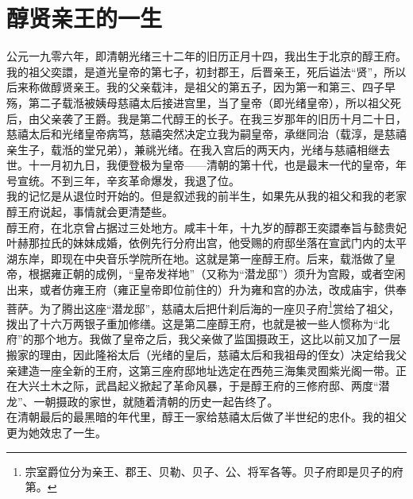 \fancyhead[RO]{} %
\fancyhead[LE]{} %
\chapter*{醇贤亲王的一生}
\thispagestyle{empty}
  公元一九零六年，即清朝光绪三十二年的旧历正月十四，我出生于北京的醇王府。我的祖父奕譞，是道光皇帝的第七子，初封郡王，后晋亲王，死后谥法“贤”，所以后来称做醇贤亲王。我的父亲载沣，是祖父的第五子，因为第一和第三、四子早殇，第二子载湉被姨母慈禧太后接进宫里，当了皇帝（即光绪皇帝），所以祖父死后，由父亲袭了王爵。我是第二代醇王的长子。在我三岁那年的旧历十月二十日，慈禧太后和光绪皇帝病笃，慈禧突然决定立我为嗣皇帝，承继同治（载淳，是慈禧亲生子，载湉的堂兄弟），兼祧光绪。在我入宫后的两天内，光绪与慈禧相继去世。十一月初九日，我便登极为皇帝——清朝的第十代，也是最末一代的皇帝，年号宣统。不到三年，辛亥革命爆发，我退了位。\\

  我的记忆是从退位时开始的。但是叙述我的前半生，如果先从我的祖父和我的老家醇王府说起，事情就会更清楚些。\\

  醇王府，在北京曾占据过三处地方。咸丰十年，十九岁的醇郡王奕譞奉旨与懿贵妃叶赫那拉氏的妹妹成婚，依例先行分府出宫，他受赐的府邸坐落在宣武门内的太平湖东岸，即现在中央音乐学院所在地。这就是第一座醇王府。后来，载湉做了皇帝，根据雍正朝的成例，“皇帝发祥地”（又称为“潜龙邸”）须升为宫殿，或者空闲出来，或者仿雍王府（雍正皇帝即位前住的）升为雍和宫的办法，改成庙宇，供奉菩萨。为了腾出这座“潜龙邸”，慈禧太后把什刹后海的一座贝子府\footnote{宗室爵位分为亲王、郡王、贝勒、贝子、公、将军各等。贝子府即是贝子的府第。}赏给了祖父，拨出了十六万两银子重加修缮。这是第二座醇王府，也就是被一些人惯称为“北府”的那个地方。我做了皇帝之后，我父亲做了监国摄政王，这比以前又加了一层搬家的理由，因此隆裕太后（光绪的皇后，慈禧太后和我祖母的侄女）决定给我父亲建造一座全新的王府，这第三座府邸地址选定在西苑三海集灵囿紫光阁一带。正在大兴土木之际，武昌起义掀起了革命风暴，于是醇王府的三修府邸、两度“潜龙”、一朝摄政的家世，就随着清朝的历史一起告终了。\\

  在清朝最后的最黑暗的年代里，醇王一家给慈禧太后做了半世纪的忠仆。我的祖父更为她效忠了一生。\\

